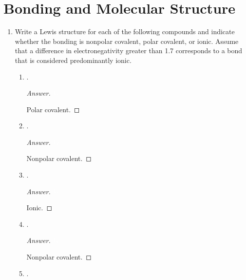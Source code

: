 \documentclass[../psets.tex]{subfiles}
\begin{document}
\section{Bonding and Molecular Structure}
\begin{enumerate}
    \item {}Write a Lewis structure for each of the following compounds and indicate whether the bonding is nonpolar covalent, polar covalent, or ionic. Assume that a difference in electronegativity greater than 1.7 corresponds to a bond that is considered predominantly ionic.
    \begin{enumerate}
        \item {}.
        \begin{proof}[Answer]
            ${\color{white}hi}$
            \begin{center}
            \end{center}
            Polar covalent.
        \end{proof}
        \item {}.
        \begin{proof}[Answer]
            ${\color{white}hi}$
            \begin{center}
            \end{center}
            Nonpolar covalent.
        \end{proof}
        \item {}.
        \begin{proof}[Answer]
            ${\color{white}hi}$
            \begin{center}
            \end{center}
            Ionic.
        \end{proof}
        \item {}.
        \begin{proof}[Answer]
            ${\color{white}hi}$
            \begin{center}
            \end{center}
            Nonpolar covalent.
        \end{proof}
        \item {}.

\end{enumerate}
\end{enumerate}
\end{document}

